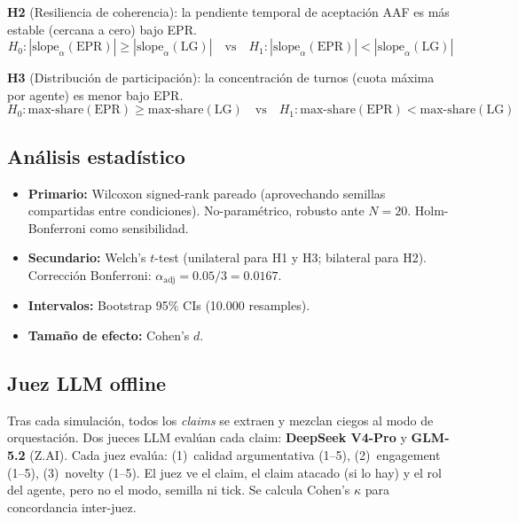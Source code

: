 \documentclass{llncs}
\begin{document}
\textbf{H2} (Resiliencia de coherencia): la pendiente temporal de
aceptaci\'on AAF es m\'as estable (cercana a cero) bajo EPR.
\begin{equation*}
    H_0: |\text{slope}_{\alpha}(\text{EPR})| \ge
          |\text{slope}_{\alpha}(\text{LG})| \quad\text{vs}\quad
    H_1: |\text{slope}_{\alpha}(\text{EPR})| <
          |\text{slope}_{\alpha}(\text{LG})|
\end{equation*}

\textbf{H3} (Distribuci\'on de participaci\'on): la concentraci\'on de
turnos (cuota m\'axima por agente) es menor bajo EPR.
\begin{equation*}
    H_0: \text{max-share}(\text{EPR}) \ge
          \text{max-share}(\text{LG}) \quad\text{vs}\quad
    H_1: \text{max-share}(\text{EPR}) <
          \text{max-share}(\text{LG})
\end{equation*}

\subsection{An\'alisis estad\'istico}

\begin{itemize}[nosep,leftmargin=*]
\item \textbf{Primario:} Wilcoxon signed-rank pareado (aprovechando
  semillas compartidas entre condiciones). No-param\'etrico, robusto ante
  $N{=}20$. Holm-Bonferroni como sensibilidad.
\item \textbf{Secundario:} Welch's $t$-test (unilateral para H1 y H3;
  bilateral para H2). Correcci\'on Bonferroni:
  $\alpha_{\text{adj}} = 0.05/3 = 0.0167$.
\item \textbf{Intervalos:} Bootstrap 95\% CIs (10.000 resamples).
\item \textbf{Tama\~no de efecto:} Cohen's $d$.
\end{itemize}

\subsection{Juez LLM offline}

Tras cada simulaci\'on, todos los \emph{claims} se extraen y mezclan
ciegos al modo de orquestaci\'on. Dos jueces LLM eval\'uan cada claim:
\textbf{DeepSeek V4-Pro} y \textbf{GLM-5.2} (Z.AI). Cada juez eval\'ua:
(1)~calidad argumentativa (1--5), (2)~engagement (1--5),
(3)~novelty (1--5). El juez ve el claim, el claim atacado (si lo hay) y
el rol del agente, pero no el modo, semilla ni tick. Se calcula
Cohen's $\kappa$ para concordancia inter-juez.
\end{document}

